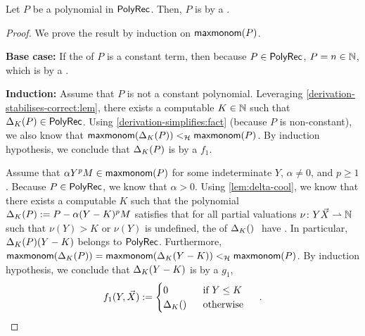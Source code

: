 \documentclass[sigconf,natbib=false,screen, review,anonymous]{acmart}
\begin{document}
\begin{lemma}
    \label{lem:correct-to-n-rat}
    Let $P$ be a polynomial in $\mathsf{PolyRec}$.
    Then, 
    $P$ is
     by a .
\end{lemma}
\begin{proof}
    We prove the result by induction on $\mathop{\mathsf{maxmonom}}(P)$. 

    \textbf{Base case:} If the  of $P$ is a constant term,
    then because $P \in \mathsf{PolyRec}$, $P = n \in \mathbb{N}$, which is
     by a .

    \textbf{Induction:} Assume that $P$ is not a constant polynomial.
    Leveraging \cref{derivation-stabilises-correct:lem}, there exists a
    computable $K \in \mathbb{N}$ such that $\Delta_{K}(P) \in \mathsf{PolyRec}$. Using
    \cref{derivation-simplifies:fact} (because $P$ is non-constant), we also
    know that $\mathop{\mathsf{maxmonom}}(\Delta_{K}(P)) <_{\mathcal{H}} \mathop{\mathsf{maxmonom}}(P)$.
    By induction hypothesis, we conclude that $\Delta_{K}(P)$ is 
    by a  $f_1$.



    Assume that $\alpha Y^p M \in \mathop{\mathsf{maxmonom}}(P)$
    for some indeterminate $Y$, $\alpha \neq 0$, and $p \geq 1$.
    Because $P \in \mathsf{PolyRec}$, we know that $\alpha > 0$.
    Using \cref{lem:delta-cool},
    we know that there exists a computable $K$ such that
    the polynomial
    $\Delta_{K}(P) \mathrel{:=} P - \alpha (Y - K)^p M$
    satisfies that for all partial valuations $\nu \colon Y\vec{X} \rightharpoonup \mathbb{N}$
    such that $\nu(Y) > K$ or $\nu(Y)$ is undefined,
    the  of $\Diff{K}$ have .
    In particular, $\Delta_{K}(P) (Y - K)$  belongs to $\mathsf{PolyRec}$.
    Furthermore, $\mathop{\mathsf{maxmonom}}(\Delta_{K}(P)) = \mathop{\mathsf{maxmonom}}(\Delta_{K}(Y - K))
    <_{\mathcal{H}} \mathop{\mathsf{maxmonom}}(P)$.
    By induction hypothesis,
    we conclude that
    $\Delta_{K}(Y - K)$ is 
    by a  $g_1$,
    \begin{equation*}
        f_1(Y, \vec{X}) \defined
        \begin{cases}
            0 & \text{ if } Y \leq K \\
            \Diff{K} & \text{ otherwise }
        \end{cases}
        \quad .
    \end{equation*}


\end{proof}
\end{document}
